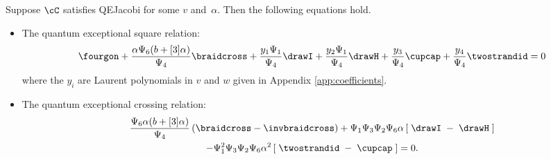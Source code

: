 \documentclass[12pt]{amsart}
\begin{document}
\begin{proposition} \label{prop:square-crossing}
  Suppose $\cC$ satisfies QEJacobi for some $v$ and~$\alpha$.
  Then the following equations hold.
\begin{itemize}
  \item The quantum exceptional square relation:
\begin{equation*} [3] \fourgon + \frac{\alpha \Psi_6 (b+[3]\alpha)}{\Psi_4} \braidcross + \frac{y_1 \Psi_1}{\Psi_4} \drawI + \frac{y_2 \Psi_1}{\Psi_4} \drawH + \frac{y_3}{\Psi_4} \cupcap + \frac{y_4}{\Psi_4} \twostrandid =0
\end{equation*}
where the $y_i$ are Laurent polynomials in $v$ and $w$ given in Appendix \ref{app:coefficients}.
  \item
The quantum exceptional crossing relation:
\begin{multline*}
\frac{\Psi_6 \alpha (b+[3]\alpha)}{\Psi_4} \left(\braidcross -
  \invbraidcross \right) + \Psi_1 \Psi_3 \Psi_2 \Psi_6 \alpha \left[\;\drawI \; - \; \drawH \; \right] \\
- \Psi_1^2 \Psi_3 \Psi_2 \Psi_6 \alpha^2 \left[\; \twostrandid \; - \; \cupcap \; \right] = 0.
\end{multline*}
\end{itemize}
 \end{proposition}
\end{document}
